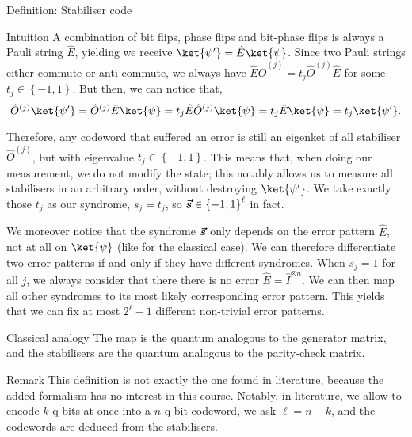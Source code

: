 \documentclass[a4paper]{article}
\begin{document}
\begin{parag}{Definition: Stabiliser code}
\begin{subparag}{Intuition}
        A combination of bit flips, phase flips and bit-phase flips is always a Pauli string $\hat{E}$, yielding we receive $\ket{\psi'} = \hat{E} \ket{\psi}$. Since two Pauli strings either commute or anti-commute, we always have $\hat{E} \hat{O}^{\left(j\right)} = t_j \hat{O}^{\left(j\right)} \hat{E}$ for some $t_j \in \left\{-1, 1\right\}$. But then, we can notice that, 
        \[\hat{O}^{\left(j\right)} \ket{\psi'} = \hat{O}^{\left(j\right)} \hat{E} \ket{\psi} = t_j \hat{E} \hat{O}^{\left(j\right)} \ket{\psi} = t_j \hat{E} \ket{\psi} = t_j \ket{\psi'}.\]

        Therefore, any codeword that suffered an error is still an eigenket of all stabiliser $\hat{O}^{\left(j\right)}$, but with eigenvalue $t_j \in \left\{-1, 1\right\}$. This means that, when doing our measurement, we do not modify the state; this notably allows us to measure all stabilisers in an arbitrary order, without destroying $\ket{\psi'}$. We take exactly those $t_j$ as our syndrome, $s_j = t_j$, so $\bvec{s} \in \left\{-1, 1\right\}^{\ell }$ in fact.

        We moreover notice that the syndrome $\bm{\protect\vec{s}}$ only depends on the error pattern $\hat{E}$, not at all on $\ket{\psi}$ (like for the classical case). We can therefore differentiate two error patterns if and only if they have different syndromes. When $s_j = 1$ for all $j$, we always consider that there there is no error $\hat{E} = \hat{I}^{\otimes n}$. We can then map all other syndromes to its most likely corresponding error pattern. This yields that we can fix at most $2^{\ell } - 1$ different non-trivial error patterns.
    \end{subparag}
    
    \begin{subparag}{Classical analogy}
        The map is the quantum analogous to the generator matrix, and the stabilisers are the quantum analogous to the parity-check matrix.
    \end{subparag}

    \begin{subparag}{Remark}
        This definition is not exactly the one found in literature, because the added formalism has no interest in this course. Notably, in literature, we allow to encode $k$ q-bits at once into a $n$ q-bit codeword, we ask $\ell = n - k$, and the codewords are deduced from the stabilisers.
    \end{subparag}
\end{parag}
\end{document}
